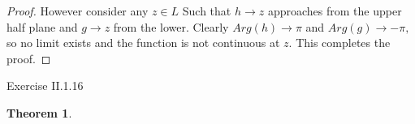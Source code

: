 \documentclass[letter]{article}
\newtheorem{theorem}{Theorem}
\newenvironment{menumerate}{%
  \edef\backupindent{\the\parindent}%
  \enumerate%
  \setlength{\parindent}{\backupindent}%
}{\endenumerate}
\begin{document}
\begin{menumerate}
\begin{proof}
		However consider any $z \in L$ Such that $h \to z$ approaches from the upper half plane and $g \to z$ from the lower. Clearly $Arg(h) \to \pi$ and $Arg(g) \to -\pi,$ so no limit exists and the function is not continuous at $z.$ This completes the proof.
	\end{proof}

	\item Exercise II.1.16
	\begin{theorem}
	
	\end{theorem}
\end{menumerate}
\end{document}
